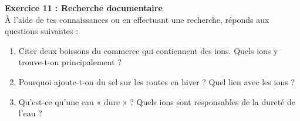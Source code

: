 \documentclass[11pt,a4paper]{article}
\newcommand{\cadreblanc}[1]{%
	\medskip\framebox[\linewidth][c]{%
		\rule{0mm}{#1mm}}\par
	\medskip}
\begin{document}
	\vfill
	
	\textbf{Exercice 11 : Recherche documentaire} \\
	
	À l'aide de tes connaissances ou en effectuant une recherche, réponds aux questions suivantes :
	
	\vspace{5mm}
	
	\begin{enumerate}
		\item Citer deux boissons du commerce qui contiennent des ions. Quels ions y trouve-t-on principalement ?
		
		\cadreblanc{25}
		
		\item Pourquoi ajoute-t-on du sel sur les routes en hiver ? Quel lien avec les ions ?
		
		\cadreblanc{25}
		
		\item Qu'est-ce qu'une eau « dure » ? Quels ions sont responsables de la dureté de l'eau ?
		
		\cadreblanc{25}
	\end{enumerate}
	
	\vfill
	
\end{document}
